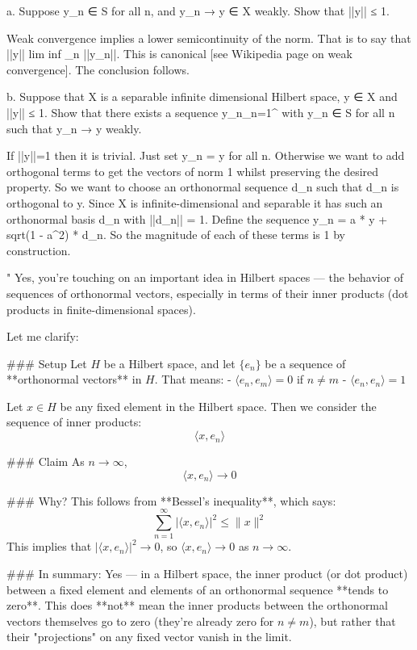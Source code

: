 a. Suppose y_n ∈ S for all n, and y_n → y ∈ X weakly. Show that ||y|| ≤ 1.

Weak convergence implies a lower semicontinuity of the norm. That is to say that ||y|| \le lim inf _{n \to \infty} ||y_n||. This is canonical [see Wikipedia page on weak convergence]. The conclusion follows.

b. Suppose that X is a separable infinite dimensional Hilbert space, y ∈ X and ||y|| ≤ 1. Show that there exists a sequence {y_n}_{n=1}^{\infty} with y_n ∈ S for all n such that y_n → y weakly.

If ||y||=1 then it is trivial. Just set y_n = y for all n. Otherwise we want to add orthogonal terms to get the vectors of norm 1 whilst preserving the desired property. So we want to choose an orthonormal sequence d_n such that d_n is orthogonal to y. Since X is infinite-dimensional and separable it has such an orthonormal basis {d_n} with ||d_n|| = 1. Define the sequence y_n = a * y + sqrt(1 - a^2) * d_n. So the magnitude of each of these terms is 1 by construction.

"
Yes, you're touching on an important idea in Hilbert spaces — the behavior of sequences of orthonormal vectors, especially in terms of their inner products (dot products in finite-dimensional spaces).

Let me clarify:

### Setup
Let \( H \) be a Hilbert space, and let \( \{e_n\} \) be a sequence of **orthonormal vectors** in \( H \). That means:
- \( \langle e_n, e_m \rangle = 0 \) if \( n \ne m \)
- \( \langle e_n, e_n \rangle = 1 \)

Let \( x \in H \) be any fixed element in the Hilbert space. Then we consider the sequence of inner products:
\[
\langle x, e_n \rangle
\]

### Claim
As \( n \to \infty \),  
\[
\langle x, e_n \rangle \to 0
\]

### Why?
This follows from **Bessel's inequality**, which says:
\[
\sum_{n=1}^\infty |\langle x, e_n \rangle|^2 \leq \|x\|^2
\]
This implies that \( |\langle x, e_n \rangle|^2 \to 0 \), so \( \langle x, e_n \rangle \to 0 \) as \( n \to \infty \).

### In summary:
Yes — in a Hilbert space, the inner product (or dot product) between a fixed element and elements of an orthonormal sequence **tends to zero**. This does **not** mean the inner products between the orthonormal vectors themselves go to zero (they're already zero for \( n \ne m \)), but rather that their "projections" on any fixed vector vanish in the limit.

